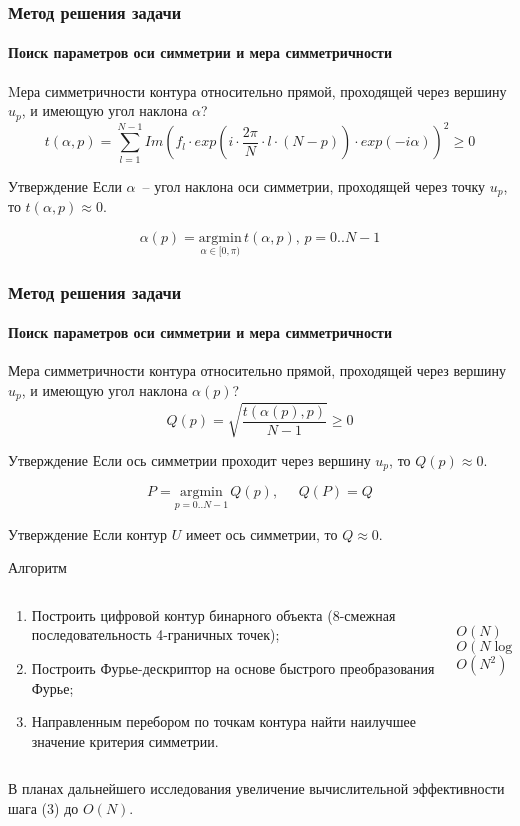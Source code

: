 \documentclass[11pt]{beamer}
\begin{document}
\begin{frame}
\frametitle{Метод решения задачи}
\framesubtitle{Поиск параметров оси симметрии и мера симметричности}
Mера симметричности контура относительно прямой, проходящей через вершину $u_p$, и имеющую угол наклона $\alpha$?
$$t(\alpha,p) = \sum_{l=1}^{N-1} Im(f_l \cdot exp(i \cdot \frac{2\pi}{N} \cdot l \cdot (N-p)) \cdot exp(-i\alpha))^2 \geq 0$$ 
\begin{block}{Утверждение}
Если $\alpha$~-- угол наклона оси симметрии, проходящей через точку $u_p$, то $t(\alpha,p) \approx 0$. 
\end{block}
$$\alpha(p) = \underset{\alpha \in [0,\pi)}{\mathrm{argmin}}\, t(\alpha,p),\, p=0..N-1$$
\end{frame}


\begin{frame}
\frametitle{Метод решения задачи}
\framesubtitle{Поиск параметров оси симметрии и мера симметричности}
Мера симметричности контура относительно прямой, проходящей через вершину $u_p$, и имеющую угол наклона $\alpha(p)$? 
$$Q(p) = \sqrt{\frac{t(\alpha(p),p)}{N-1}} \geq 0$$
\begin{block}{Утверждение}
Если ось симметрии проходит через вершину $u_p$, то $Q(p)\approx0$.
\end{block}
$$P = \underset{p = 0..N-1}{\mathrm{argmin}}\,Q(p), \;\;\;\;\; Q(P) = Q$$
\begin{block}{Утверждение}
Если контур $U$ имеет ось симметрии, то $Q \approx 0$.
\end{block}
\end{frame}

\begin{frame}{Алгоритм}
\begin{columns}
\begin{column}{0.8\textwidth}
\begin{enumerate}
\item Построить цифровой контур бинарного объекта  (8-смежная последовательность 4-граничных точек); 
\item Построить Фурье-дескриптор на основе быстрого преобразования Фурье; 
\item Направленным перебором по точкам контура найти наилучшее значение критерия симметрии.
\end{enumerate}
\end{column}
\begin{column}{0.15\textwidth}
\vspace{3\baselineskip}\\
$O(N)$
\vspace{2\baselineskip}\\
$O(N\log{}N)$
\vspace{\baselineskip}\\
$O(N^2)$
\vspace{3\baselineskip}
\end{column}
\end{columns}
В планах дальнейшего исследования увеличение вычислительной эффективности шага (3) до $O(N)$.
\end{frame}
\end{document}
